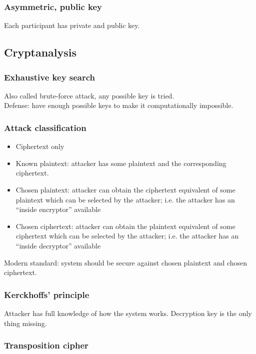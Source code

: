 \documentclass{article}
\begin{document}
\subsubsection{Asymmetric, public key}

Each participant has private and public key.

\subsection{Cryptanalysis}

\subsubsection{Exhaustive key search}

Also called brute-force attack, any possible key is tried.\\
Defense: have enough possible keys to make it computationally impossible.

\subsubsection{Attack classification}

\begin{itemize}
    \item Ciphertext only
    \item Known plaintext: attacker has some plaintext and the corresponding ciphertext.
    \item Chosen plaintext: attacker can obtain the ciphertext equivalent of some plaintext which can be selected by the attacker; i.e. the attacker has an “inside encryptor” available
    \item Chosen ciphertext: attacker can obtain the plaintext equivalent of some ciphertext which can be selected by the attacker; i.e. the attacker has an “inside decryptor” available
\end{itemize}

Modern standard: system should be secure against chosen plaintext and chosen ciphertext.

\subsubsection{Kerckhoffs' principle}

Attacker has full knowledge of how the system works. Decryption key is the only thing missing.

\subsubsection{Transposition cipher}
\end{document}
